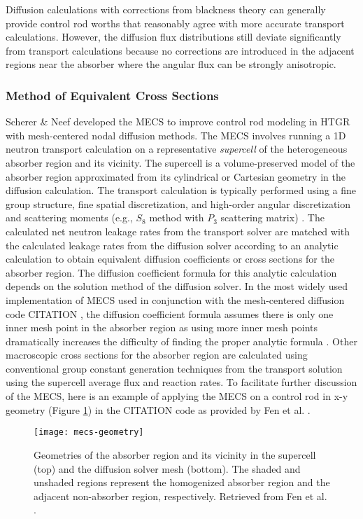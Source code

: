 Diffusion calculations with corrections from blackness theory can generally provide control rod
worths that reasonably agree with more accurate transport calculations. However, the
diffusion flux distributions still deviate significantly from transport calculations because no
corrections are introduced in the adjacent regions near the absorber where the angular flux can be
strongly anisotropic.

\subsubsection{Method of Equivalent Cross Sections}

Scherer \& Neef developed the \gls{MECS} \cite{scherer_determination_1976} to improve control rod
modeling in \gls{HTGR} with mesh-centered nodal diffusion methods. The \gls{MECS} involves running
a 1D neutron transport calculation on a representative \textit{supercell} of the heterogeneous
absorber region and its vicinity. The supercell is a volume-preserved model of the absorber region
approximated from its cylindrical or Cartesian geometry in the diffusion calculation. The transport
calculation is typically performed using a fine group structure, fine spatial discretization, and
high-order angular discretization and scattering moments (e.g., $S_8$ method with $P_3$ scattering
matrix) \cite{fen_modelling_1992}. The calculated net neutron leakage rates from the transport
solver are matched with the calculated leakage rates from the diffusion solver according to an
analytic calculation to obtain equivalent diffusion coefficients or cross sections for the absorber
region. The diffusion coefficient formula for this analytic calculation depends on the solution
method of the diffusion solver. In the most widely used implementation of \gls{MECS} used in
conjunction with the mesh-centered diffusion code CITATION \cite{teuchert_vsop94_1994}, the
diffusion coefficient formula assumes there is only one inner mesh point in the absorber region as
using more inner mesh points dramatically increases the difficulty of finding the proper analytic
formula \cite{fen_modelling_1992}. Other macroscopic cross sections for the absorber region are
calculated using conventional group constant generation techniques from the transport solution
using the supercell average flux and reaction rates. To facilitate further discussion of the
\gls{MECS}, here is an example of applying the \gls{MECS} on a control rod in x-y geometry (Figure
\ref{fig:mecs-geometry}) in the CITATION code as provided by Fen et al. \cite{fen_modelling_1992}.
%
\begin{figure}[htb]
    \centering
    \texttt{[image: mecs-geometry]}
    \caption{Geometries of the absorber region and its vicinity in the supercell
      (top) and the diffusion solver mesh (bottom).
        The shaded and unshaded regions represent the homogenized absorber
        region and the adjacent non-absorber region, respectively.
        Retrieved from Fen et al. \cite{fen_modelling_1992}.}
    \label{fig:mecs-geometry}
\end{figure}


